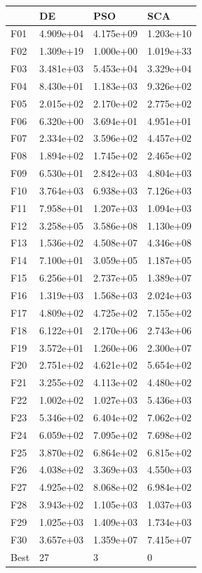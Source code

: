 \begin{tabular}{llll}
\toprule
{} &         DE &        PSO &        SCA \\
\midrule
F01  &  4.909e+04 &  4.175e+09 &  1.203e+10 \\
F02  &  1.309e+19 &  1.000e+00 &  1.019e+33 \\
F03  &  3.481e+03 &  5.453e+04 &  3.329e+04 \\
F04  &  8.430e+01 &  1.183e+03 &  9.326e+02 \\
F05  &  2.015e+02 &  2.170e+02 &  2.775e+02 \\
F06  &  6.320e+00 &  3.694e+01 &  4.951e+01 \\
F07  &  2.334e+02 &  3.596e+02 &  4.457e+02 \\
F08  &  1.894e+02 &  1.745e+02 &  2.465e+02 \\
F09  &  6.530e+01 &  2.842e+03 &  4.804e+03 \\
F10  &  3.764e+03 &  6.938e+03 &  7.126e+03 \\
F11  &  7.958e+01 &  1.207e+03 &  1.094e+03 \\
F12  &  3.258e+05 &  3.586e+08 &  1.130e+09 \\
F13  &  1.536e+02 &  4.508e+07 &  4.346e+08 \\
F14  &  7.100e+01 &  3.059e+05 &  1.187e+05 \\
F15  &  6.256e+01 &  2.737e+05 &  1.389e+07 \\
F16  &  1.319e+03 &  1.568e+03 &  2.024e+03 \\
F17  &  4.809e+02 &  4.725e+02 &  7.155e+02 \\
F18  &  6.122e+01 &  2.170e+06 &  2.743e+06 \\
F19  &  3.572e+01 &  1.260e+06 &  2.300e+07 \\
F20  &  2.751e+02 &  4.621e+02 &  5.654e+02 \\
F21  &  3.255e+02 &  4.113e+02 &  4.480e+02 \\
F22  &  1.002e+02 &  1.027e+03 &  5.436e+03 \\
F23  &  5.346e+02 &  6.404e+02 &  7.062e+02 \\
F24  &  6.059e+02 &  7.095e+02 &  7.698e+02 \\
F25  &  3.870e+02 &  6.864e+02 &  6.815e+02 \\
F26  &  4.038e+02 &  3.369e+03 &  4.550e+03 \\
F27  &  4.925e+02 &  8.068e+02 &  6.984e+02 \\
F28  &  3.943e+02 &  1.105e+03 &  1.037e+03 \\
F29  &  1.025e+03 &  1.409e+03 &  1.734e+03 \\
F30  &  3.657e+03 &  1.359e+07 &  7.415e+07 \\
Best &         27 &          3 &          0 \\
\bottomrule
\end{tabular}
